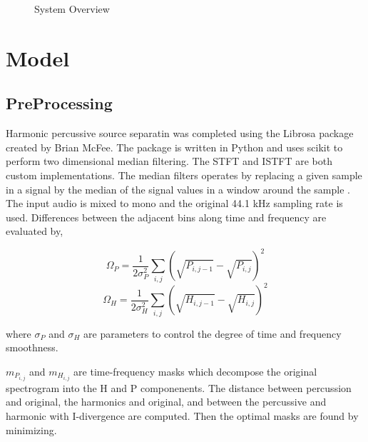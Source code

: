 \documentclass{article}
\begin{document}
\begin{figure}
\caption{System Overview}
\label{fig:overview}
\end{figure}

\section{Model}

\subsection{PreProcessing}
Harmonic percussive source separatin was completed using the Librosa package created by Brian McFee.
The package is written in Python and uses scikit to perform two dimensional median filtering. The
STFT and ISTFT are both custom implementations. The median filters operates by replacing a given sample
in a signal by the median of the signal values in a window around the sample \cite{FitzGerald:11}. The input
audio is mixed to mono and the original 44.1 kHz sampling rate is used. Differences between the adjacent
bins along time and frequency are evaluated by,

$$\Omega_{P} = \frac{1}{2\sigma ^{2}_{P}} \sum_{i,j} (\sqrt{P_{i,j-1}}-\sqrt{P_{i,j}})^{2}$$
$$\Omega_{H} = \frac{1}{2\sigma ^{2}_{H}} \sum_{i,j} (\sqrt{H_{i,j-1}}-\sqrt{H_{i,j}})^{2}$$

where $\sigma_{P}$ and $\sigma_{H}$ are parameters to control the degree of time and frequency
smoothness.

$m_{P_{i,j}}$ and $m_{H_{i,j}}$ are time-frequency masks which decompose the original
spectrogram into the H and P componenents. The distance between percussion and
original, the harmonics and original, and between the percussive and harmonic with
I-divergence are computed. Then the optimal masks are found by minimizing.
\end{document}
